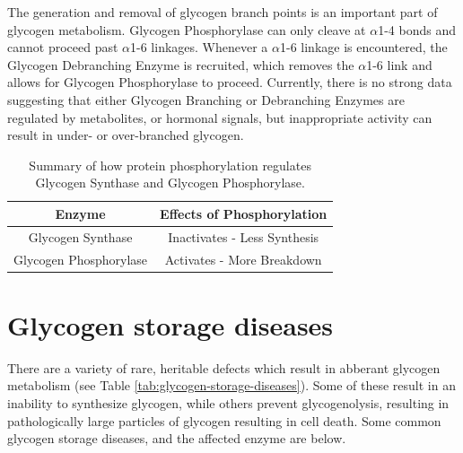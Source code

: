 \documentclass{tufte-handout}
\begin{document}
The generation and removal of glycogen branch points is an important part of glycogen metabolism.  Glycogen Phosphorylase can only cleave at $\alpha$1-4 bonds and cannot proceed past $\alpha$1-6 linkages.  Whenever a $\alpha$1-6 linkage is encountered, the Glycogen Debranching Enzyme is recruited, which removes the $\alpha$1-6 link and allows for Glycogen Phosphorylase to proceed.  Currently, there is no strong data suggesting that either Glycogen Branching or Debranching Enzymes are regulated by metabolites, or hormonal signals, but inappropriate activity can result in under- or over-branched glycogen.


\begin{table}
\centering
\caption{Summary of how protein phosphorylation regulates Glycogen Synthase and Glycogen Phosphorylase.}
\label{tab:gs-gp-phosphorylation}
\begin{tabular}{cc}
\hline
\textbf {Enzyme} & \textbf{Effects of Phosphorylation}  \\
\hline
Glycogen Synthase & Inactivates - Less Synthesis \\
Glycogen Phosphorylase & Activates - More Breakdown\\
\hline
\end{tabular}
\end{table}

\section{Glycogen storage diseases}

There are a variety of rare, heritable defects which result in abberant glycogen metabolism (see Table \ref{tab:glycogen-storage-diseases}).  Some of these result in an inability to synthesize glycogen, while others prevent glycogenolysis, resulting in pathologically large particles of glycogen resulting in cell death.  Some common glycogen storage diseases, and the affected enzyme are below.   
\end{document}

